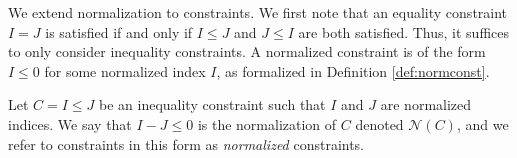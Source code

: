We extend normalization to constraints. We first note that an equality constraint $I = J$ is satisfied if and only if $I \leq J$ and $J \leq I$ are both satisfied. Thus, it suffices to only consider inequality constraints. A normalized constraint is of the form $I \leq 0$ for some normalized index $I$, as formalized in Definition \ref{def:normconst}.
%
\begin{definition}\label{def:normconst}
    Let $C = I \leq J$ be an inequality constraint such that $I$ and $J$ are normalized indices. We say that $I-J \leq 0$ is the normalization of $C$ denoted $\mathcal{N}(C)$, and we refer to constraints in this form as \textit{normalized} constraints.
%
\end{definition}
%
%
%
